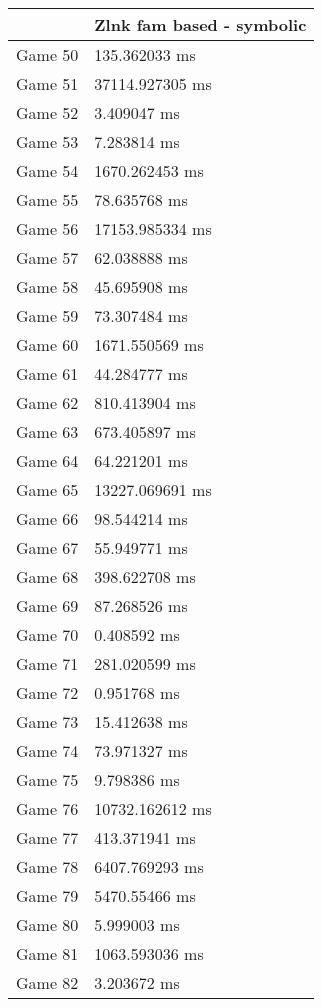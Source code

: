 \begin{tabular}{|l|l|}
	\hline
	& Zlnk fam based - symbolic \\ \hline
	Game 50 & 135.362033 ms \\ \hline
	Game 51 & 37114.927305 ms \\ \hline
	Game 52 & 3.409047 ms \\ \hline
	Game 53 & 7.283814 ms \\ \hline
	Game 54 & 1670.262453 ms \\ \hline
	Game 55 & 78.635768 ms \\ \hline
	Game 56 & 17153.985334 ms \\ \hline
	Game 57 & 62.038888 ms \\ \hline
	Game 58 & 45.695908 ms \\ \hline
	Game 59 & 73.307484 ms \\ \hline
	Game 60 & 1671.550569 ms \\ \hline
	Game 61 & 44.284777 ms \\ \hline
	Game 62 & 810.413904 ms \\ \hline
	Game 63 & 673.405897 ms \\ \hline
	Game 64 & 64.221201 ms \\ \hline
	Game 65 & 13227.069691 ms \\ \hline
	Game 66 & 98.544214 ms \\ \hline
	Game 67 & 55.949771 ms \\ \hline
	Game 68 & 398.622708 ms \\ \hline
	Game 69 & 87.268526 ms \\ \hline
	Game 70 & 0.408592 ms \\ \hline
	Game 71 & 281.020599 ms \\ \hline
	Game 72 & 0.951768 ms \\ \hline
	Game 73 & 15.412638 ms \\ \hline
	Game 74 & 73.971327 ms \\ \hline
	Game 75 & 9.798386 ms \\ \hline
	Game 76 & 10732.162612 ms \\ \hline
	Game 77 & 413.371941 ms \\ \hline
	Game 78 & 6407.769293 ms \\ \hline
	Game 79 & 5470.55466 ms \\ \hline
	Game 80 & 5.999003 ms \\ \hline
	Game 81 & 1063.593036 ms \\ \hline
	Game 82 & 3.203672 ms \\ \hline

\end{tabular}
